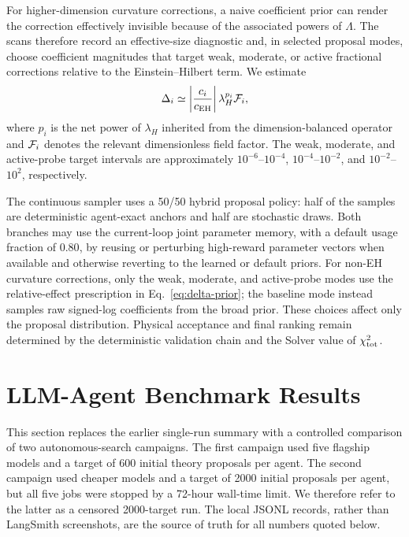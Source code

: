 \documentclass[aps,prd,twocolumn,superscriptaddress,nofootinbib,longbibliography]{revtex4-2}
\newcommand{\Lam}{\Lambda}
\begin{document}
For higher-dimension curvature corrections, a naive coefficient prior can render the correction effectively invisible because of the associated powers of $\Lam$.  The scans therefore record an effective-size diagnostic and, in selected proposal modes, choose coefficient magnitudes that target weak, moderate, or active fractional corrections relative to the Einstein--Hilbert term.  We estimate
\begin{equation}
\Delta_i\simeq
\left|\frac{c_i}{c_{\rm EH}}\right|\lambda_H^{p_i}{\cal F}_i ,
\label{eq:delta-prior}
\end{equation}
where $p_i$ is the net power of $\lambda_H$ inherited from the dimension-balanced operator and ${\cal F}_i$ denotes the relevant dimensionless field factor.  The weak, moderate, and active-probe target intervals are approximately $10^{-6}$--$10^{-4}$, $10^{-4}$--$10^{-2}$, and $10^{-2}$--$10^{2}$, respectively.

The continuous sampler uses a 50/50 hybrid proposal policy: half of the samples are deterministic agent-exact anchors and half are stochastic draws.  Both branches may use the current-loop joint parameter memory, with a default usage fraction of $0.80$, by reusing or perturbing high-reward parameter vectors when available and otherwise reverting to the learned or default priors.  For non-EH curvature corrections, only the weak, moderate, and active-probe modes use the relative-effect prescription in Eq.~\eqref{eq:delta-prior}; the baseline mode instead samples raw signed-log coefficients from the broad prior.  These choices affect only the proposal distribution.  Physical acceptance and final ranking remain determined by the deterministic validation chain and the Solver value of $\chi^2_{\rm tot}$.


\section{LLM-Agent Benchmark Results}
\label{sec:results}

This section replaces the earlier single-run summary with a controlled comparison of two autonomous-search campaigns.  The first campaign used five flagship models and a target of 600 initial theory proposals per agent.  The second campaign used cheaper models and a target of 2000 initial proposals per agent, but all five jobs were stopped by a 72-hour wall-time limit.  We therefore refer to the latter as a censored 2000-target run.  The local JSONL records, rather than LangSmith screenshots, are the source of truth for all numbers quoted below.
\end{document}
